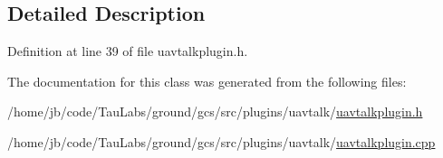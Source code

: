 \subsection{\-Detailed \-Description}


\-Definition at line 39 of file uavtalkplugin.\-h.



\-The documentation for this class was generated from the following files\-:\begin{DoxyCompactItemize}
\item 
/home/jb/code/\-Tau\-Labs/ground/gcs/src/plugins/uavtalk/\hyperlink{uavtalkplugin_8h}{uavtalkplugin.\-h}\item 
/home/jb/code/\-Tau\-Labs/ground/gcs/src/plugins/uavtalk/\hyperlink{uavtalkplugin_8cpp}{uavtalkplugin.\-cpp}\end{DoxyCompactItemize}
